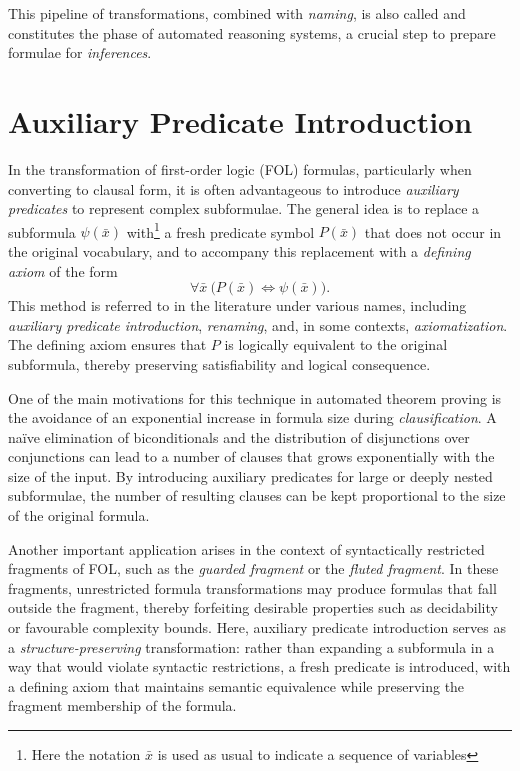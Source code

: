 This pipeline of transformations, combined with \emph{naming}, is also called  and  constitutes the  phase of automated reasoning systems, a crucial step to prepare formulae for \emph{inferences}.

\section{Auxiliary Predicate Introduction}\label{sec:auxiliary_predicate_introduction}

In the transformation of first-order logic (FOL) formulas, particularly when converting to clausal form, it is often advantageous to introduce \emph{auxiliary predicates} to represent complex subformulae. The general idea is to replace a subformula \(\psi(\bar{x})\) with\footnote{Here the notation \(\bar{x}\) is used as usual to indicate a sequence of variables} a fresh predicate symbol \(P(\bar{x})\) that does not occur in the original vocabulary, and to accompany this replacement with a \emph{defining axiom} of the form
\[
\forall \bar{x}\ \big(P(\bar{x}) \iff \psi(\bar{x})\big).
\]
This method is referred to in the literature under various names, including \emph{auxiliary predicate introduction}, \emph{renaming}, and, in some contexts, \emph{axiomatization}. The defining axiom ensures that \(P\) is logically equivalent to the original subformula, thereby preserving satisfiability and logical consequence.

One of the main motivations for this technique in automated theorem proving is the avoidance of an exponential increase in formula size during \emph{clausification}.
A naïve elimination of biconditionals and the distribution of disjunctions over conjunctions can lead to a number of clauses that grows exponentially with the size of the input.
By introducing auxiliary predicates for large or deeply nested subformulae, the number of resulting clauses can be kept proportional to the size of the original formula.

Another important application arises in the context of syntactically restricted fragments of FOL, such as the \emph{guarded fragment} or the \emph{fluted fragment}.
In these fragments, unrestricted formula transformations may produce formulas that fall outside the fragment, thereby forfeiting desirable properties such as decidability or favourable complexity bounds.
Here, auxiliary predicate introduction serves as a \emph{structure-preserving} transformation: rather than expanding a subformula in a way that would violate syntactic restrictions, a fresh predicate is introduced, with a defining axiom that maintains semantic equivalence while preserving the fragment membership of the formula.

